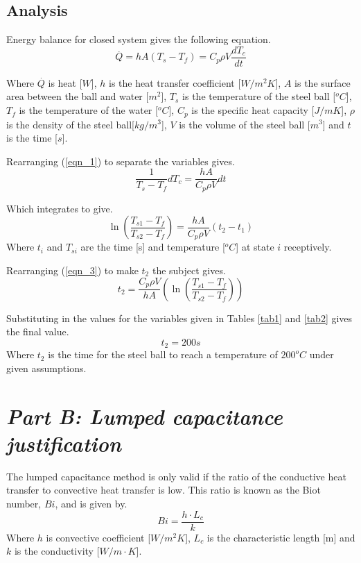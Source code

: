 \documentclass[11pt]{article}
\begin{document}
\subsection{Analysis}

Energy balance for closed system gives the following equation.
\begin{equation}\label{eqn_1}
	\stackrel{.}{Q} = hA(T_{s}-T_{f}) = C_{p}\rho V \frac{dT_{c}}{dt}
\end{equation}

Where $\stackrel{.}{Q}$ is heat [$W$], $h$ is the heat transfer coefficient [$W/m^{2}K$], $A$ is the surface area between the ball and water [$m^{2}$], $T_{s}$ is the temperature of the steel ball [$^{o}C$], $T_{f}$ is the temperature of the water [$^{o}C$], $C_{p}$ is the specific heat capacity [$J/mK$], $\rho$ is the density of the steel ball[$kg/m^{3}$], $V$ is the volume of the steel ball [$m^3$] and $t$ is the time [$s$].
\newline

Rearranging (\ref{eqn_1}) to separate the variables gives.
\begin{equation}\label{key}
	\frac{1}{T_{s}-T_{f}} dT_{c} = \frac{hA}{C_{p}\rho V}dt
\end{equation}

Which integrates to give.
\begin{equation}\label{eqn_3}
	\ln{(\frac{T_{s1}-T_{f}}{T_{s2}-T_{f}})} =  \frac{hA}{C_{p}\rho V}(t_{2}-t_{1})
\end{equation}
Where $t_{i}$ and $T_{si}$ are the time [s] and temperature [$^oC$] at state $i$ receptively.

Rearranging (\ref{eqn_3}) to make $t_{2}$ the subject gives.
\begin{equation}\label{key}
	t_{2} = \frac{C_{p}\rho V}{hA}(\ln{(\frac{T_{s1}-T_{f}}{T_{s2}-T_{f}})})
\end{equation}

Substituting in the values for the variables given in Tables \ref{tab1} and \ref{tab2} gives the final value.
\boldmath
\begin{equation}\label{t1}
	t_2 = 200 s
\end{equation}
\unboldmath
Where $t_2$ is the time for the steel ball to reach a temperature of $200^{o}C$ under given assumptions.

\section{\emph{Part B: Lumped capacitance justification}}
The lumped capacitance method is only valid if the ratio of the conductive heat transfer to convective heat transfer is low. This ratio is known as the Biot number, $Bi$, and is given by.
\begin{equation}\label{eqn_biot}
	Bi = \frac{h \cdot L_{c}}{k}
\end{equation}
Where $h$ is convective coefficient [$W/m^{2}K$], $L_{c}$ is the characteristic length [m] and $k$ is the conductivity [$W/m \cdot K$]. 
\end{document}
